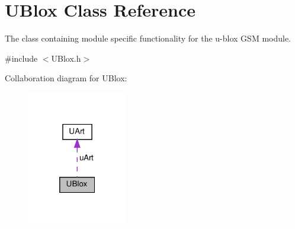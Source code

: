 \hypertarget{class_u_blox}{}\section{U\+Blox Class Reference}
\label{class_u_blox}


The class containing module specific functionality for the u-\/blox G\+SM module.  




{\ttfamily \#include $<$U\+Blox.\+h$>$}



Collaboration diagram for U\+Blox\+:\nopagebreak
\begin{figure}[H]
\begin{center}
\leavevmode
\includegraphics[width=124pt]{d9/d30/class_u_blox__coll__graph}
\end{center}
\end{figure}
